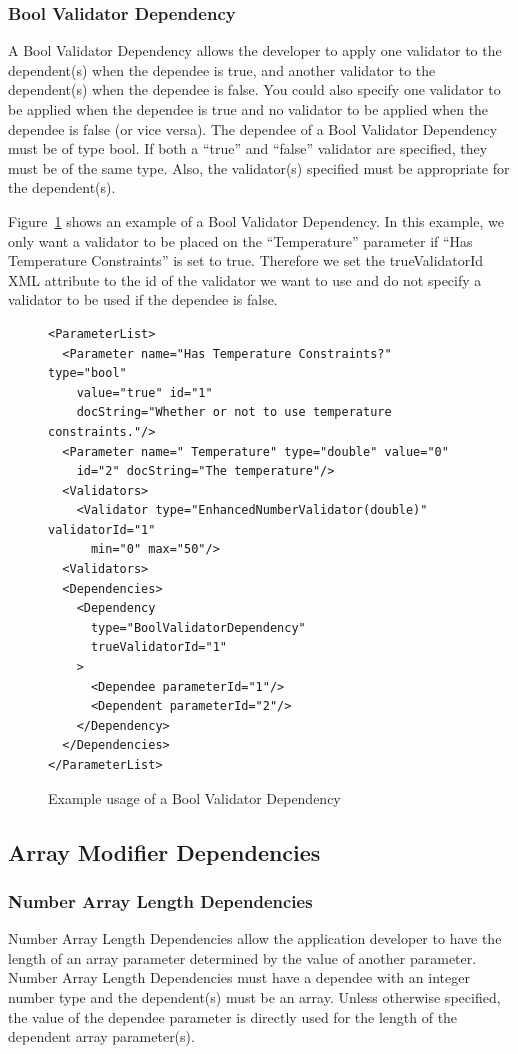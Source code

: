 \subsubsection{Bool Validator Dependency}
A Bool Validator Dependency allows the developer to apply one validator to the dependent(s) when the dependee is true, and another validator
to the dependent(s) when the dependee is false. You could also specify one validator to be applied when the dependee is true and no validator
to be applied when the dependee is false (or vice versa). The dependee of a Bool Validator Dependency must be of type bool. If both a ``true'' and
``false'' validator are specified, they must be of the same type. Also, the validator(s) specified must be appropriate for the dependent(s).

Figure~\ref{BoolValidDepXML} shows an example of a Bool Validator Dependency. In this example, we only want a validator to be placed on the
``Temperature'' parameter if ``Has Temperature Constraints'' is set to true. Therefore we set the trueValidatorId XML attribute to the id of the
validator we want to use and do not specify a validator to be used if the dependee is false.
\begin{figure}
\centering
{\footnotesize
\begin{Verbatim}
<ParameterList>
  <Parameter name="Has Temperature Constraints?" type="bool" 
    value="true" id="1" 
    docString="Whether or not to use temperature constraints."/>
  <Parameter name=" Temperature" type="double" value="0"
    id="2" docString="The temperature"/>
  <Validators>
    <Validator type="EnhancedNumberValidator(double)" validatorId="1"
      min="0" max="50"/>
  <Validators>
  <Dependencies>
    <Dependency 
      type="BoolValidatorDependency" 
      trueValidatorId="1"
    >
      <Dependee parameterId="1"/>
      <Dependent parameterId="2"/>
    </Dependency>
  </Dependencies>
</ParameterList>
\end{Verbatim}
}
\caption{Example usage of a Bool Validator Dependency}
\label{BoolValidDepXML}
\end{figure}

\subsection{Array Modifier Dependencies}
\subsubsection{Number Array Length Dependencies}
Number Array Length Dependencies allow the application developer to have the length of an array parameter determined by the value of another parameter. 
Number Array Length Dependencies must have a dependee with an integer number type and the dependent(s) must be an array. Unless otherwise specified, 
the value of the dependee parameter is directly used for the length of the dependent array parameter(s). 

